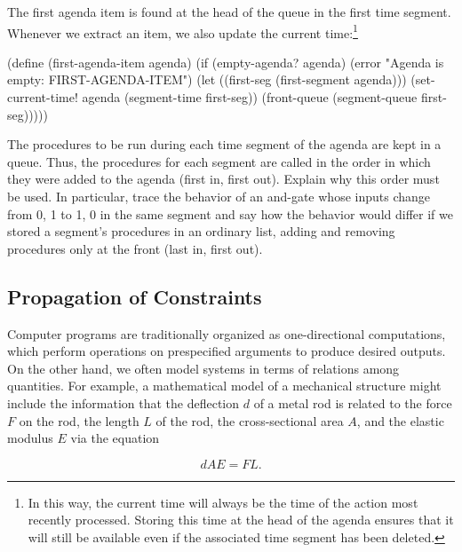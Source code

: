 \noindent
The first agenda item is found at the head of the queue in the first time
segment.  Whenever we extract an item, we also update the current
time:\footnote{In this way, the current time will always be the time of the
action most recently processed.  Storing this time at the head of the agenda
ensures that it will still be available even if the associated time segment has
been deleted.}

\begin{codeBlock}
(define (first-agenda-item agenda)
  (if (empty-agenda? agenda)
      (error "Agenda is empty: FIRST-AGENDA-ITEM")
      (let ((first-seg (first-segment agenda)))
        (set-current-time! agenda
                           (segment-time first-seg))
        (front-queue (segment-queue first-seg)))))
\end{codeBlock}

\begin{exerciseGroup}
\label{Exercise 3.32}
 The procedures to be run during
each time segment of the agenda are kept in a queue.  Thus, the procedures for
each segment are called in the order in which they were added to the agenda
(first in, first out).  Explain why this order must be used.  In particular,
trace the behavior of an and-gate whose inputs change from 0, 1 to 1, 0 in the
same segment and say how the behavior would differ if we stored a segment's
procedures in an ordinary list, adding and removing procedures only at the
front (last in, first out).
\end{exerciseGroup}


\subsection{Propagation of Constraints}
\label{Section 3.3.5}

Computer programs are traditionally organized as one-directional computations,
which perform operations on prespecified arguments to produce desired outputs.
On the other hand, we often model systems in terms of relations among
quantities.  For example, a mathematical model of a mechanical structure might
include the information that the deflection \( d \) of a metal rod is related to
the force \( F \) on the rod, the length \( L \) of the rod, the cross-sectional
area \( A \), and the elastic modulus \( E \) via the equation

$$ dAE = FL. $$

